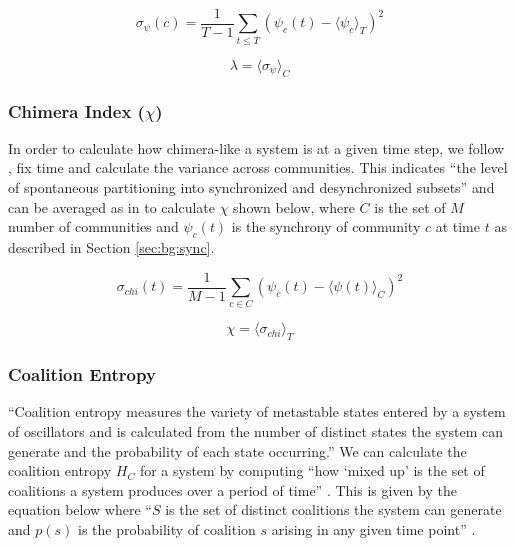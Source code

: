 \documentclass[a4paper,11pt]{article}
\begin{document}
\begin{equation} \label{eq:sigma-met}
\sigma_{\psi}(c) = \frac{1}{T - 1} \sum_{t \leq T }(\psi_{c}(t) - \langle \psi_{c}\rangle_T)^2
\end{equation}

\begin{equation} \label{eq:lambda}
\lambda = \langle \sigma_{\psi} \rangle_C
\end{equation}

\subsubsection{Chimera Index ($\chi$)}
\label{sec:bg:chi}

In order to calculate how chimera-like a system is at a given time step, we follow \cite{Shanahan2010, Bhowmik2013}, fix time and calculate the variance across communities. This indicates ``the level of spontaneous partitioning into synchronized and desynchronized subsets'' \cite{Bhowmik2013} and can be averaged as in \cite{Shanahan2010} to calculate $\chi$ shown below, where $C$ is the set of $M$ number of communities and $\psi_c(t)$ is the synchrony of community $c$ at time $t$ as described in Section \ref{sec:bg:sync}.

\begin{equation} \label{eq:var-sync}
\sigma_{chi}(t) = \frac{1}{M - 1}\sum_{c \in C}(\psi_c(t) - \langle \psi(t) \rangle_C)^2
\end{equation}

\begin{equation} \label{eq:chi}
\chi = \langle \sigma_{chi} \rangle_T
\end{equation}


\subsubsection{Coalition Entropy} \label{sec:bg:hc}

``Coalition entropy measures the variety of metastable states entered by a system of oscillators and is calculated from the number of distinct states the system can generate and the probability of each state occurring.'' \cite{Bhowmik2013} We can calculate the coalition entropy $H_C$ for a system by computing ``how `mixed up' is the set of coalitions a system produces over a period of time'' \cite{Shanahan2010}. This is given by the equation below where ``$S$ is the set of distinct coalitions the system can generate and $p(s)$ is the probability of coalition $s$ arising in any given time point'' \cite{Shanahan2010}.
\end{document}
